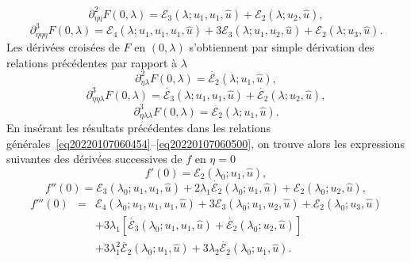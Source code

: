 \documentclass{article}
\newcommand{\nocomma}{}
\newcommand{\nosymbol}{}
\begin{document}
\begin{equation}
  \partial_{\eta \nocomma \eta}^2 F (0, \lambda) =\mathcal{E}_3 (\lambda ;
  u_1, u_1, \hat{u}) +\mathcal{E}_2 (\lambda ; u_2, \hat{u}),
\end{equation}
\begin{equation}
  \partial_{\eta \nocomma \eta \nocomma \eta}^3 F (0, \lambda) =\mathcal{E}_4
  (\lambda ; u_1, u_1, u_1, \hat{u}) + 3\mathcal{E}_3 (\lambda ; u_1, u_2,
  \hat{u}) +\mathcal{E}_2 (\lambda ; u_3, \hat{u}) .
\end{equation}
Les dérivées croisées de $F$ en $(0, \lambda)$ s'obtiennent par
simple dérivation des relations précédentes par rapport à
$\lambda$
\begin{equation}
  \partial_{\eta \nocomma \lambda}^2 F (0, \lambda) = \dot{\mathcal{E}_2}
  (\lambda ; u_1, \hat{u}),
\end{equation}
\begin{equation}
  \partial_{\eta \nocomma \eta \nocomma \lambda}^3 F (0, \lambda) =
  \dot{\mathcal{E}_3} (\lambda ; u_1, u_1, \hat{u}) + \dot{\mathcal{E}_2}
  (\lambda ; u_2, \hat{u}),
\end{equation}
\begin{equation}
  \partial_{\eta \nocomma \lambda \nocomma \lambda}^3 F (0, \lambda) =
  \ddot{\mathcal{E}_2} (\lambda ; u_1, \hat{u}) .
\end{equation}
En insérant les résultats précédentes dans les relations
générales~\eqref{eq20220107060454}--\eqref{eq20220107060500}, on
trouve alors les expressions suivantes des dérivées successives de $f$
en $\eta = 0$
\begin{equation}
  f' (0) =\mathcal{E}_2 (\lambda_0 ; u_1, \hat{u}),
\end{equation}
\begin{equation}
  f'' (0) =\mathcal{E}_3 (\lambda_0 ; u_1, u_1, \hat{u}) + 2 \lambda_1
  \dot{\mathcal{E}_2} (\lambda_0 ; u_1, \hat{u}) +\mathcal{E}_2 (\lambda_0 ;
  u_2, \hat{u}),
\end{equation}
\begin{eqnarray}
  f''' (0) & = & \mathcal{E}_4 (\lambda_0 ; u_1, u_1, u_1, \hat{u}) +
  3\mathcal{E}_3 (\lambda_0 ; u_1, u_2, \hat{u}) +\mathcal{E}_2 (\lambda_0 ;
  u_3, \hat{u}) \nonumber\\
  &  & \nosymbol + 3 \lambda_1  [\dot{\mathcal{E}_3} (\lambda_0 ; u_1, u_1,
  \hat{u}) + \dot{\mathcal{E}_2} (\lambda_0 ; u_2, \hat{u})] \nonumber\\
  &  & \nosymbol + 3 \lambda_1^2  \ddot{\mathcal{E}_2} (\lambda_0 ; u_1,
  \hat{u}) + 3 \lambda_2  \dot{\mathcal{E}_2} (\lambda_0 ; u_1, \hat{u}) .
\end{eqnarray}
\end{document}

